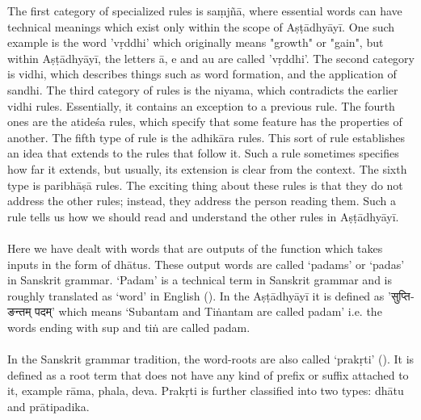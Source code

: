 The first category of specialized rules is saṃjñā, where essential words can have technical meanings which exist only within the scope of Aṣṭādhyāyī. One such example is the word 'vṛddhi’ which originally means "growth" or "gain", but within Aṣṭādhyāyī, the letters ā, e and au are called 'vṛddhi’. The second category is vidhi, which describes things such as word formation, and the application of sandhi. The third category of rules is the niyama, which contradicts the earlier vidhi rules. Essentially, it contains an exception to a previous rule. The fourth ones are the atideśa rules, which specify that some feature has the properties of another. The fifth type of rule is the adhikāra rules. This sort of rule establishes an idea that extends to the rules that follow it. Such a rule sometimes specifies how far it extends, but usually, its extension is clear from the context. The sixth type is paribhāṣā rules. The exciting thing about these rules is that they do not address the other rules; instead, they address the person reading them. Such a rule tells us how we should read and understand the other rules in Aṣṭādhyāyī. \\\\
Here we have dealt with words that are outputs of the function which takes inputs in the form of dhātus. These output words are called ‘padams’ or ‘padas’ in Sanskrit grammar. ‘Padam’ is a technical term in Sanskrit grammar and is roughly translated as ‘word’ in English (\cite{Swamiji}). In the Aṣṭādhyāyī it is defined as 
\texthindi{'सुप्तिङन्तम् पदम्'} which means ‘Subantam and Tiṅantam are called padam’ i.e. the words ending with sup and tiṅ are called padam.\\\\
In the Sanskrit grammar tradition, the word-roots are also called ‘prakṛti’ (\cite{prasad}). It is defined as a root term that does not have any kind of prefix or suffix attached to it, example rāma, phala, deva. Prakṛti is further classified into two types: dhātu and prātipadika.\\ 

